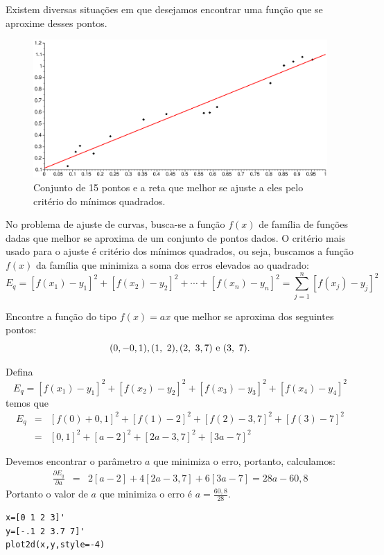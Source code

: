 Existem diversas situações em que desejamos encontrar uma função que se aproxime desses pontos.
\begin{figure}[htp]
\begin{center}
\includegraphics[width=15cm,angle=0]{./cap_aproxfun/pics/ajuste_reta.eps}
{\caption{Conjunto de 15 pontos e a reta que melhor se ajuste a eles pelo critério do mínimos quadrados.}}
\end{center}
\end{figure}

No problema de ajuste de curvas, busca-se a função $f(x)$ de família de funções dadas que melhor se aproxima de um conjunto de pontos dados. O critério mais usado para o ajuste é critério dos mínimos quadrados, ou seja, buscamos a função $f(x)$ da família que minimiza a soma dos erros elevados ao quadrado:
$$E_q=\left[f(x_1)-y_1\right]^2+\left[f(x_2)-y_2\right]^2+\cdots +\left[f(x_n)-y_n\right]^2=\sum_{j=1}^n \left[f(x_j)-y_j\right]^2$$

\begin{ex} Encontre a função do tipo $f(x)=ax$ que melhor se aproxima dos seguintes pontos:
  \begin{equation*}
    (0,-0,1), (1,~2), (2,~3,7) ~ \hbox{e} ~(3,~7).  
  \end{equation*}
\end{ex}
\begin{sol}
Defina $$E_q=[f(x_1)-y_1]^2+[f(x_2)-y_2]^2+[f(x_3)-y_3]^2+[f(x_4)-y_4]^2$$
temos que
\begin{eqnarray*}
E_q&=&[f(0)+0,1]^2+[f(1)-2]^2+[f(2)-3,7]^2+[f(3)-7]^2\\
&=&[0,1]^2+[a-2]^2+[2a-3,7]^2+[3a-7]^2
\end{eqnarray*}

Devemos encontrar o parâmetro $a$ que minimiza o erro, portanto, calculamos:
\begin{eqnarray*}
\frac{\partial E_q}{\partial a}&=&2[a-2]+4[2a-3,7]+6[3a-7]=28a-60,8
\end{eqnarray*}
Portanto o valor de $a$ que minimiza o erro é $a=\frac{60,8}{28}$.
\ifisscilab
\begin{verbatim}
x=[0 1 2 3]'
y=[-.1 2 3.7 7]'
plot2d(x,y,style=-4)
\end{verbatim}
\fi
\end{sol}

